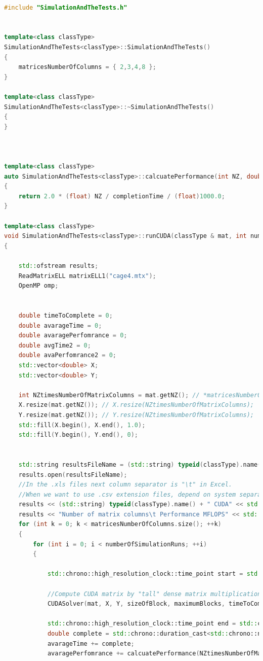 \documentclass{scrreprt}
\begin{document}
\begin{lstlisting}[language=C++, caption=main.cu]

#include "SimulationAndTheTests.h"


template<class classType>
SimulationAndTheTests<classType>::SimulationAndTheTests()
{
	matricesNumberOfColumns = { 2,3,4,8 };
}

template<class classType>
SimulationAndTheTests<classType>::~SimulationAndTheTests()
{
}



template<class classType>
auto SimulationAndTheTests<classType>::calcuatePerformance(int NZ, double completionTime)
{
	return 2.0 * (float) NZ / completionTime / (float)1000.0;
}

template<class classType>
void SimulationAndTheTests<classType>::runCUDA(classType & mat, int numberOfThreads, int sizeOfBlock, int maximumBlocks, int numberOfSimulationRuns)
{

	std::ofstream results;
	ReadMatrixELL matrixELL1("cage4.mtx");
	OpenMP omp;


	double timeToComplete = 0;
	double avarageTime = 0;
	double avaragePerfomrance = 0;
	double avgTime2 = 0;
	double avaPerfomrance2 = 0;
	std::vector<double> X;
	std::vector<double> Y;

	int NZtimesNumberOfMatrixColumns = mat.getNZ(); // *matricesNumberOfColumns[k];
	X.resize(mat.getNZ()); // X.resize(NZtimesNumberOfMatrixColumns);
	Y.resize(mat.getNZ()); // Y.resize(NZtimesNumberOfMatrixColumns);
	std::fill(X.begin(), X.end(), 1.0);
	std::fill(Y.begin(), Y.end(), 0);


	std::string resultsFileName = (std::string) typeid(classType).name() + "CUDA" + mat.getMatrixName() + ".xls";
	results.open(resultsFileName);
	//In the .xls files next column separator is "\t" in Excel. 
	//When we want to use .csv extension files, depend on system separator could be "," or ";" .
	results << (std::string) typeid(classType).name() + " CUDA" << std::endl;
	results << "Number of matrix columns\t Performance MFLOPS" << std::endl;
	for (int k = 0; k < matricesNumberOfColumns.size(); ++k)
	{
		for (int i = 0; i < numberOfSimulationRuns; ++i)
		{

			std::chrono::high_resolution_clock::time_point start = std::chrono::high_resolution_clock::now();

			//Compute CUDA matrix by "tall" dense matrix multiplication product
			CUDASolver(mat, X, Y, sizeOfBlock, maximumBlocks, timeToComplete);

			std::chrono::high_resolution_clock::time_point end = std::chrono::high_resolution_clock::now();
			double complete = std::chrono::duration_cast<std::chrono::nanoseconds>(end - start).count() / 1000000.0;
			avarageTime += complete;
			avaragePerfomrance += calcuatePerformance(NZtimesNumberOfMatrixColumns, complete);


\end{lstlisting}
\end{document}
